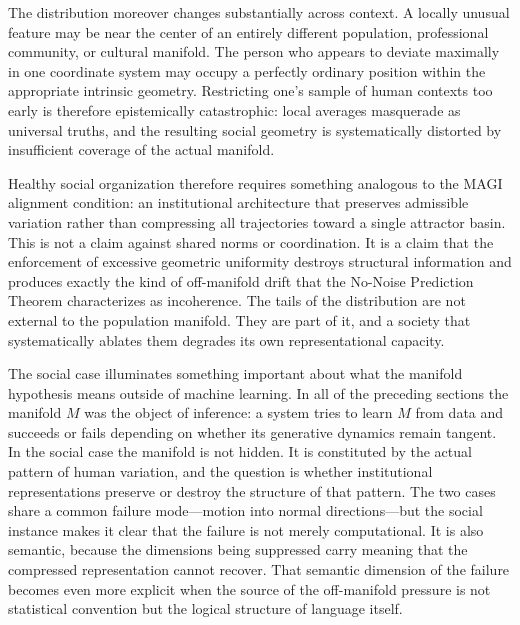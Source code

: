 \documentclass[11pt,a4paper,twocolumn]{article}
\begin{document}
The distribution moreover changes substantially across context.
A locally unusual feature may be near the center of an entirely
different population, professional community, or cultural manifold.
The person who appears to deviate maximally in one coordinate system
may occupy a perfectly ordinary position within the appropriate
intrinsic geometry. Restricting one's sample of human contexts too
early is therefore epistemically catastrophic: local averages
masquerade as universal truths, and the resulting social geometry
is systematically distorted by insufficient coverage of the actual
manifold.

Healthy social organization therefore requires something analogous
to the MAGI alignment condition: an institutional architecture that
preserves admissible variation rather than compressing all
trajectories toward a single attractor basin. This is not a claim
against shared norms or coordination. It is a claim that the
enforcement of excessive geometric uniformity destroys structural
information and produces exactly the kind of off-manifold drift
that the No-Noise Prediction Theorem characterizes as incoherence.
The tails of the distribution are not external to the population
manifold. They are part of it, and a society that systematically
ablates them degrades its own representational capacity.

The social case illuminates something important about what the
manifold hypothesis means outside of machine learning. In all
of the preceding sections the manifold $M$ was the object of
inference: a system tries to learn $M$ from data and succeeds
or fails depending on whether its generative dynamics remain
tangent. In the social case the manifold is not hidden. It is
constituted by the actual pattern of human variation, and
the question is whether institutional representations preserve
or destroy the structure of that pattern. The two cases share
a common failure mode---motion into normal directions---but
the social instance makes it clear that the failure is not
merely computational. It is also semantic, because the
dimensions being suppressed carry meaning that the compressed
representation cannot recover. That semantic dimension of the
failure becomes even more explicit when the source of the
off-manifold pressure is not statistical convention but the
logical structure of language itself.

\end{document}
